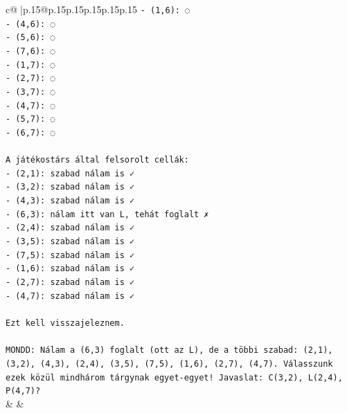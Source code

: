 \documentclass{article}
\begin{document}
{\begin{supertabular}{c@{$\;$}|p{.15\linewidth}@{}p{.15\linewidth}p{.15\linewidth}p{.15\linewidth}p{.15\linewidth}p{.15\linewidth}}
{{{\texttt{{-} (1,6): ◌} \\
\texttt{{-} (4,6): ◌} \\
\texttt{{-} (5,6): ◌} \\
\texttt{{-} (7,6): ◌} \\
\texttt{{-} (1,7): ◌} \\
\texttt{{-} (2,7): ◌} \\
\texttt{{-} (3,7): ◌} \\
\texttt{{-} (4,7): ◌} \\
\texttt{{-} (5,7): ◌} \\
\texttt{{-} (6,7): ◌} \\
\\ 
\texttt{A játékostárs által felsorolt cellák:} \\
\texttt{{-} (2,1): szabad nálam is ✓} \\
\texttt{{-} (3,2): szabad nálam is ✓} \\
\texttt{{-} (4,3): szabad nálam is ✓} \\
\texttt{{-} (6,3): nálam itt van L, tehát foglalt ✗} \\
\texttt{{-} (2,4): szabad nálam is ✓} \\
\texttt{{-} (3,5): szabad nálam is ✓} \\
\texttt{{-} (7,5): szabad nálam is ✓} \\
\texttt{{-} (1,6): szabad nálam is ✓} \\
\texttt{{-} (2,7): szabad nálam is ✓} \\
\texttt{{-} (4,7): szabad nálam is ✓} \\
\\ 
\texttt{Ezt kell visszajeleznem.} \\
\\ 
\texttt{MONDD: Nálam a (6,3) foglalt (ott az L), de a többi szabad: (2,1), (3,2), (4,3), (2,4), (3,5), (7,5), (1,6), (2,7), (4,7). Válasszunk ezek közül mindhárom tárgynak egyet{-}egyet! Javaslat: C(3,2), L(2,4), P(4,7)?} \\
            }
        }
    }
    & & \\ \\


\end{supertabular}}
\end{document}
